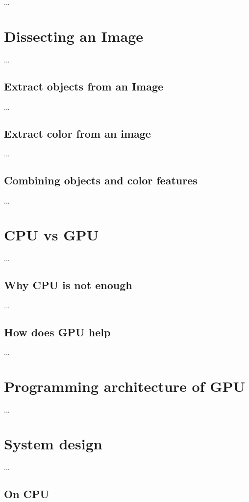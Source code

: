 \documentclass[english]{tktltiki}
\begin{document}
...

\section{Dissecting an Image}

...

\subsection{Extract objects from an Image}

...

\subsection{Extract color from an image}

...

\subsection{Combining objects and color features}

...

\section{CPU vs GPU}

...


\subsection{Why CPU is not enough}

...


\subsection{How does GPU help}

...


\section{Programming architecture of GPU}

...


\section{System design}

...

\subsection{On CPU}
\end{document}
